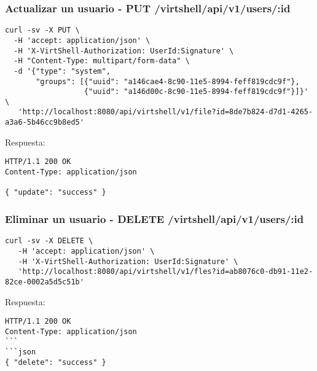 \subsubsection{Actualizar un usuario - PUT /virtshell/api/v1/users/:id}

\begin{lstlisting}[style=json]
curl -sv -X PUT \
  -H 'accept: application/json' \
  -H 'X-VirtShell-Authorization: UserId:Signature' \
  -H "Content-Type: multipart/form-data" \
  -d '{"type": "system",
       "groups": [{"uuid": "a146cae4-8c90-11e5-8994-feff819cdc9f"},
                  {"uuid": "a146d00c-8c90-11e5-8994-feff819cdc9f"}]}' \
   'http://localhost:8080/api/virtshell/v1/file?id=8de7b824-d7d1-4265-a3a6-5b46cc9b8ed5'
\end{lstlisting}

\vspace{1cm}
Respuesta:
\vspace{1cm}

\begin{lstlisting}[style=json]
HTTP/1.1 200 OK
Content-Type: application/json

{ "update": "success" }
\end{lstlisting}


\subsubsection{Eliminar un usuario - DELETE /virtshell/api/v1/users/:id}

\begin{lstlisting}[style=json]
curl -sv -X DELETE \
   -H 'accept: application/json' \
   -H 'X-VirtShell-Authorization: UserId:Signature' \
   'http://localhost:8080/api/virtshell/v1/fles?id=ab8076c0-db91-11e2-82ce-0002a5d5c51b'
\end{lstlisting}

\vspace{1cm}
Respuesta:
\vspace{1cm}

\begin{lstlisting}[style=json]
HTTP/1.1 200 OK
Content-Type: application/json
```
```json
{ "delete": "success" }
\end{lstlisting}




